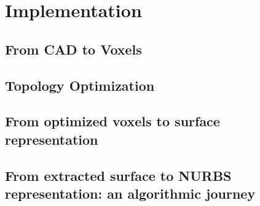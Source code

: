 %
\chapter{Implementation}
\label{chapter:software}

\section{From CAD to Voxels}
\label{sec: CADToVoxels}



\section{Topology Optimization}


\section{From optimized voxels to surface representation}


\section{From extracted surface to NURBS representation: an algorithmic journey}



